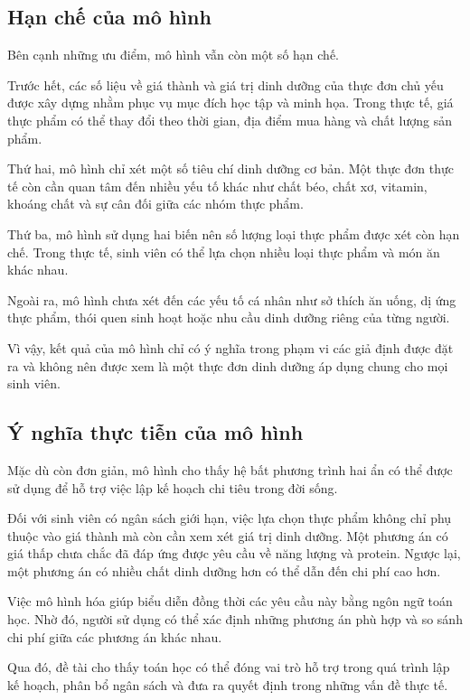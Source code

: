 \documentclass[12pt,a4paper]{article}
\begin{document}
\subsection{Hạn chế của mô hình}

Bên cạnh những ưu điểm, mô hình vẫn còn một số hạn chế.

Trước hết, các số liệu về giá thành và giá trị dinh dưỡng của thực đơn
chủ yếu được xây dựng nhằm phục vụ mục đích học tập và minh họa.
Trong thực tế, giá thực phẩm có thể thay đổi theo thời gian, địa điểm
mua hàng và chất lượng sản phẩm.

Thứ hai, mô hình chỉ xét một số tiêu chí dinh dưỡng cơ bản. Một thực
đơn thực tế còn cần quan tâm đến nhiều yếu tố khác như chất béo,
chất xơ, vitamin, khoáng chất và sự cân đối giữa các nhóm thực phẩm.

Thứ ba, mô hình sử dụng hai biến nên số lượng loại thực phẩm được xét
còn hạn chế. Trong thực tế, sinh viên có thể lựa chọn nhiều loại thực
phẩm và món ăn khác nhau.

Ngoài ra, mô hình chưa xét đến các yếu tố cá nhân như sở thích ăn
uống, dị ứng thực phẩm, thói quen sinh hoạt hoặc nhu cầu dinh dưỡng
riêng của từng người.

Vì vậy, kết quả của mô hình chỉ có ý nghĩa trong phạm vi các giả định
được đặt ra và không nên được xem là một thực đơn dinh dưỡng áp dụng
chung cho mọi sinh viên.

\subsection{Ý nghĩa thực tiễn của mô hình}

Mặc dù còn đơn giản, mô hình cho thấy hệ bất phương trình hai ẩn có
thể được sử dụng để hỗ trợ việc lập kế hoạch chi tiêu trong đời sống.

Đối với sinh viên có ngân sách giới hạn, việc lựa chọn thực phẩm
không chỉ phụ thuộc vào giá thành mà còn cần xem xét giá trị dinh
dưỡng. Một phương án có giá thấp chưa chắc đã đáp ứng được yêu cầu
về năng lượng và protein. Ngược lại, một phương án có nhiều chất dinh
dưỡng hơn có thể dẫn đến chi phí cao hơn.

Việc mô hình hóa giúp biểu diễn đồng thời các yêu cầu này bằng ngôn
ngữ toán học. Nhờ đó, người sử dụng có thể xác định những phương án
phù hợp và so sánh chi phí giữa các phương án khác nhau.

Qua đó, đề tài cho thấy toán học có thể đóng vai trò hỗ trợ trong quá
trình lập kế hoạch, phân bổ ngân sách và đưa ra quyết định trong
những vấn đề thực tế.
\end{document}
